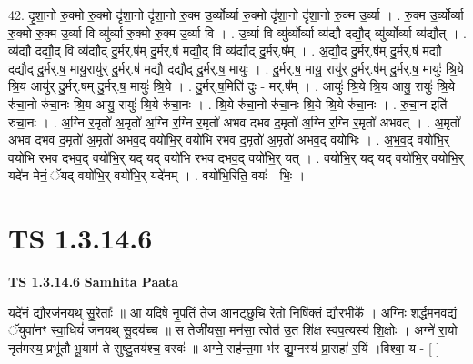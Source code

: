 \documentclass[17pt]{extarticle}
\begin{document}
42. दृ॒शा॒नो रु॒क्मो रु॒क्मो दृ॑शा॒नो दृ॑शा॒नो रु॒क्म उ॒र्व्योर्व्या रु॒क्मो दृ॑शा॒नो दृ॑शा॒नो रु॒क्म उ॒र्व्या । . रु॒क्म उ॒र्व्योर्व्या रु॒क्मो रु॒क्म उ॒र्व्या वि व्यु॑र्व्या रु॒क्मो रु॒क्म उ॒र्व्या वि । . उ॒र्व्या वि व्यु॑र्व्योर्व्या व्य॑द्यौ दद्यौ॒द् व्यु॑र्व्योर्व्या व्य॑द्यौत् । . व्य॑द्यौ दद्यौ॒द् वि व्य॑द्यौद् दु॒र्मर्.ष॑म् दु॒र्मर्.ष॑ मद्यौ॒द् वि व्य॑द्यौद् दु॒र्मर्.ष᳚म् । . अ॒द्यौ॒द् दु॒र्मर्.ष॑म् दु॒र्मर्.ष॑ मद्यौ दद्यौद् दु॒र्मर्.ष॒ मायु॒रायु॑र् दु॒र्मर्.ष॑ मद्यौ दद्यौद् दु॒र्मर्.ष॒ मायुः॑ । . दु॒र्मर्.ष॒ मायु॒ रायु॑र् दु॒र्मर्.ष॑म् दु॒र्मर्.ष॒ मायुः॑ श्रि॒ये श्रि॒य आयु॑र् दु॒र्मर्.ष॑म् दु॒र्मर्.ष॒ मायुः॑ श्रि॒ये । . दु॒र्मर्.ष॒मिति॑ दुः - मर्.ष᳚म् । . आयुः॑ श्रि॒ये श्रि॒य आयु॒ रायुः॑ श्रि॒ये रु॑चा॒नो रु॑चा॒नः श्रि॒य आयु॒ रायुः॑ श्रि॒ये रु॑चा॒नः । . श्रि॒ये रु॑चा॒नो रु॑चा॒नः श्रि॒ये श्रि॒ये रु॑चा॒नः । . रु॒चा॒न इति॑ रुचा॒नः । . अ॒ग्नि र॒मृतो॑ अ॒मृतो॑ अ॒ग्नि र॒ग्नि र॒मृतो॑ अभव दभव द॒मृतो॑ अ॒ग्नि र॒ग्नि र॒मृतो॑ अभवत् । . अ॒मृतो॑ अभव दभव द॒मृतो॑ अ॒मृतो॑ अभव॒द् वयो॑भि॒र् वयो॑भि रभव द॒मृतो॑ अ॒मृतो॑ अभव॒द् वयो॑भिः । . अ॒भ॒व॒द् वयो॑भि॒र् वयो॑भि रभव दभव॒द् वयो॑भि॒र् यद् यद् वयो॑भि रभव दभव॒द् वयो॑भि॒र् यत् । . वयो॑भि॒र् यद् यद् वयो॑भि॒र् वयो॑भि॒र् यदे॑न मेनं॒ ॅयद् वयो॑भि॒र् वयो॑भि॒र् यदे॑नम् । . वयो॑भि॒रिति॒ वयः॑ - भिः॒ । \newline
\pagebreak
{}

\section{ TS 1.3.14.6 }

\textbf{TS 1.3.14.6 } \newline
\textbf{Samhita Paata} \newline

यदे॑नं॒ द्यौरज॑नयथ् सु॒रेताः᳚ ॥ आ यदि॒षे नृ॒पतिं॒ तेज॒ आन॒ट्छुचि॒ रेतो॒ निषि॑क्तं॒ द्यौर॒भीके᳚ । अ॒ग्निः शर्द्ध॑मनव॒द्यं ॅयुवा॑नꣳ स्वा॒धियं॑ जनयथ् सू॒दय॑च्च ॥ स तेजी॑यसा॒ मन॑सा॒ त्वोत॑ उ॒त शि॑क्ष स्वप॒त्यस्य॑ शि॒क्षोः । अग्ने॑ रा॒यो नृत॑मस्य॒ प्रभू॑तौ भू॒याम॑ ते सुष्टु॒तय॑श्च॒ वस्वः॑ ॥ अग्ने॒ सह॑न्त॒मा भ॑र द्यु॒म्नस्य॑ प्रा॒सहा॑ र॒यिं ।विश्वा॒ य - [ ] \newline
\end{document}
